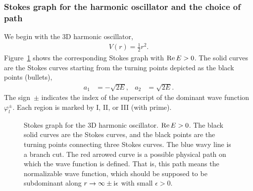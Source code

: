 \subsubsection{Stokes graph for the harmonic oscillator and the choice of path}
We begin with the $3$D harmonic oscillator,
\begin{align}
    V(r) = \frac{1}{2}r^2 .
\end{align}
Figure~\ref{src:2510_11766:fig:stokes_oscillator} shows the corresponding Stokes graph with $\operatorname{Re} E>0$.
The solid curves are the Stokes curves starting from the turning points depicted as the black points (bullets),
\begin{align}
    a_1 &= -\sqrt{2E} , &
    a_2 &= \sqrt{2E} .
\end{align}
The sign~$\pm$ indicates the index of the superscript of the dominant wave function~$\varphi_l^{\pm}$.
Each region is marked by I, II, or III (with prime).
\begin{figure}
\centering
{}
\caption{Stokes graph for the $3$D harmonic oscillator. $\operatorname{Re} E>0$.
The black solid curves are the Stokes curves, and the black points are the turning points connecting three Stokes curves.
The blue wavy line is a branch cut.
The red arrowed curve is a possible physical path on which the wave function is defined. That is, this path means the normalizable wave function, which should be supposed to be subdominant along $r\to\infty\pm \mathrm{i}\epsilon$ with small $\epsilon>0$.}
\label{src:2510_11766:fig:stokes_oscillator}
\end{figure}

